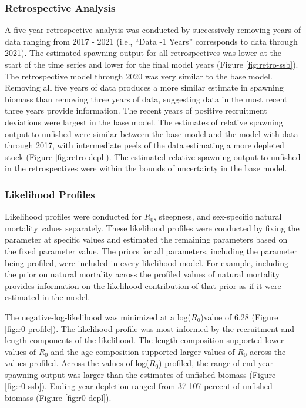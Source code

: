 \documentclass[11pt,
  letterpaper,
]{article}
\begin{document}
\subsubsection{Retrospective Analysis}\label{retrospective-analysis}

A five-year retrospective analysis was conducted by successively removing years of data ranging from 2017 - 2021 (i.e., ``Data -1 Years'' corresponds to data through 2021). The estimated spawning output for all retrospectives was lower at the start of the time series and lower for the final model years (Figure \ref{fig:retro-ssb}). The retrospective model through 2020 was very similar to the base model. Removing all five years of data produces a more similar estimate in spawning biomass than removing three years of data, suggesting data in the most recent three years provide information. The recent years of positive recruitment deviations were largest in the base model. The estimates of relative spawning output to unfished were similar between the base model and the model with data through 2017, with intermediate peels of the data estimating a more depleted stock (Figure \ref{fig:retro-depl}). The estimated relative spawning output to unfished in the retrospectives were within the bounds of uncertainty in the base model.

\subsubsection{Likelihood Profiles}\label{likelihood-profiles}

Likelihood profiles were conducted for \(R_0\), steepness, and sex-specific natural mortality values separately. These likelihood profiles were conducted by fixing the parameter at specific values and estimated the remaining parameters based on the fixed parameter value. The priors for all parameters, including the parameter being profiled, were included in every likelihood model. For example, including the prior on natural mortality across the profiled values of natural mortality provides information on the likelihood contribution of that prior as if it were estimated in the model.

The negative-log-likelihood was minimized at a log(\(R_0\))value of 6.28 (Figure \ref{fig:r0-profile}). The likelihood profile was most informed by the recruitment and length components of the likelihood. The length composition supported lower values of \(R_0\) and the age composition supported larger values of \(R_0\) across the values profiled. Across the values of log(\(R_0\)) profiled, the range of end year spawning output was larger than the estimates of unfished biomass (Figure \ref{fig:r0-ssb}). Ending year depletion ranged from 37-107 percent of unfished biomass (Figure \ref{fig:r0-depl}).
\end{document}

